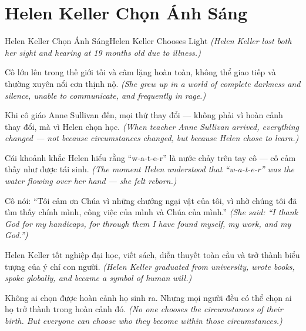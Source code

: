 \section{Helen Keller Chọn Ánh Sáng}
\begin{truyen}{Helen Keller Chọn Ánh Sáng}{Helen Keller Chooses Light}
\textit{(Helen Keller lost both her sight and hearing at 19 months old due to illness.)}

Cô lớn lên trong thế giới tối và câm lặng hoàn toàn, không thể giao tiếp và thường xuyên nổi cơn thịnh nộ.
\textit{(She grew up in a world of complete darkness and silence, unable to communicate, and frequently in rage.)}

Khi cô giáo Anne Sullivan đến, mọi thứ thay đổi — không phải vì hoàn cảnh thay đổi, mà vì Helen chọn học.
\textit{(When teacher Anne Sullivan arrived, everything changed — not because circumstances changed, but because Helen chose to learn.)}

Cái khoảnh khắc Helen hiểu rằng ``w-a-t-e-r'' là nước chảy trên tay cô — cô cảm thấy như được tái sinh.
\textit{(The moment Helen understood that ``w-a-t-e-r'' was the water flowing over her hand — she felt reborn.)}

Cô nói: ``Tôi cảm ơn Chúa vì những chướng ngại vật của tôi, vì nhờ chúng tôi đã tìm thấy chính mình, công việc của mình và Chúa của mình.''
\textit{(She said: ``I thank God for my handicaps, for through them I have found myself, my work, and my God.'')}

Helen Keller tốt nghiệp đại học, viết sách, diễn thuyết toàn cầu và trở thành biểu tượng của ý chí con người.
\textit{(Helen Keller graduated from university, wrote books, spoke globally, and became a symbol of human will.)}

\end{truyen}

\begin{baihoc}
Không ai chọn được hoàn cảnh họ sinh ra. Nhưng mọi người đều có thể chọn ai họ trở thành trong hoàn cảnh đó.
\textit{(No one chooses the circumstances of their birth. But everyone can choose who they become within those circumstances.)}
\end{baihoc}
\ngancach

